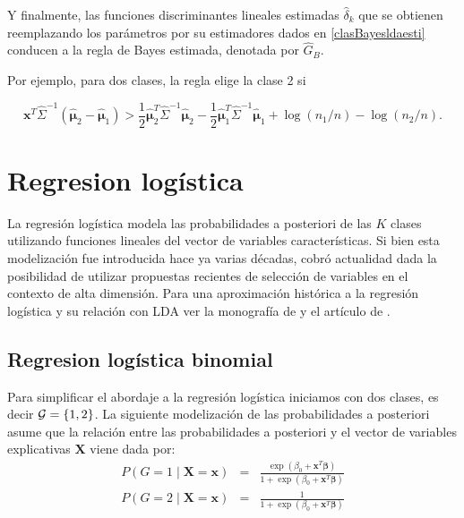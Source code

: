 \documentclass{report}
\begin{document}
Y finalmente,  las funciones discriminantes lineales estimadas $\widehat{\delta}_k$ que se obtienen reemplazando los parámetros por su estimadores dados en \eqref{clasBayesldaesti} conducen  a la regla de Bayes estimada, denotada por $\widehat{G}_B$. 


Por ejemplo, para dos clases, la regla elige la clase 2 si 

$$\mathbf{x}^T \hat{\Sigma}^{-1}\left(\hat{\boldsymbol{\mu}}_2-\hat{\boldsymbol{\mu}}_1\right)>\frac{1}{2} \hat{\boldsymbol{\mu}}_2^T \hat{\Sigma}^{-1} \hat{\boldsymbol{\mu}}_2-\frac{1}{2} \hat{\boldsymbol{\mu}}_1^T \hat{\Sigma}^{-1} \hat{\boldsymbol{\mu}}_1+\log \left(n_1 / n\right)-\log \left(n_2 / n\right).$$




\section{Regresion logística}


La regresión logística modela las probabilidades a posteriori de las $K$ clases utilizando funciones lineales del vector de variables características. Si bien esta modelización fue introducida hace ya varias décadas, cobró actualidad dada la posibilidad de utilizar propuestas recientes de selección de variables en el contexto de alta dimensión.  Para una aproximación histórica a la regresión logística y su relación con LDA ver la monografía de \cite{cox1970} y el artículo de \cite{efron1975}. 

 


\subsection{Regresion logística binomial}


Para simplificar el abordaje a la regresión logística iniciamos con dos clases, es decir  ${\cal G} = \{1,2\}$. La siguiente modelización de las probabilidades a posteriori  asume que la relación  entre las probabilidades a posteriori y el vector de variables explicativas $\mathbf{X}$ viene dada por:
\begin{eqnarray}\label{logistica2}
 P(G=1 \mid  \mathbf{X}=\mathbf{x})	&=&\frac{\exp \left(\beta_0+\mathbf{x}^T\boldsymbol{\beta} \right)}{1+\exp \left(\beta_0+\mathbf{x}^T\boldsymbol{\beta}\right)}\\
 P(G=2 \mid \mathbf{X}=\mathbf{x})&=& \frac{1}{1+\exp \left(\beta_0+\mathbf{x}^T\boldsymbol{\beta} \right)}\nonumber  
\end{eqnarray}
\end{document}
